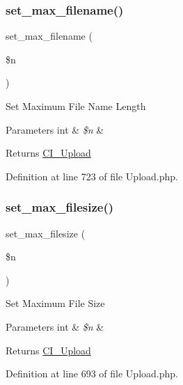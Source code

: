 \subsubsection{\texorpdfstring{set\_max\_filename()}{set\_max\_filename()}}
{\footnotesize\ttfamily set\+\_\+max\+\_\+filename (\begin{DoxyParamCaption}\item[{}]{\$n }\end{DoxyParamCaption})}

Set Maximum File Name Length


\begin{DoxyParams}[1]{Parameters}
int & {\em \$n} & \\
\hline
\end{DoxyParams}
\begin{DoxyReturn}{Returns}
\mbox{\hyperlink{class_c_i___upload}{C\+I\+\_\+\+Upload}} 
\end{DoxyReturn}


Definition at line 723 of file Upload.\+php.

\mbox{\label{class_c_i___upload_a1f78c3a54f32d313294b27cde4eafaf4}} 
\subsubsection{\texorpdfstring{set\_max\_filesize()}{set\_max\_filesize()}}
{\footnotesize\ttfamily set\+\_\+max\+\_\+filesize (\begin{DoxyParamCaption}\item[{}]{\$n }\end{DoxyParamCaption})}

Set Maximum File Size


\begin{DoxyParams}[1]{Parameters}
int & {\em \$n} & \\
\hline
\end{DoxyParams}
\begin{DoxyReturn}{Returns}
\mbox{\hyperlink{class_c_i___upload}{C\+I\+\_\+\+Upload}} 
\end{DoxyReturn}


Definition at line 693 of file Upload.\+php.

\mbox{\label{class_c_i___upload_aaed82d431f5aeee6a0af294bc604a51e}} 
